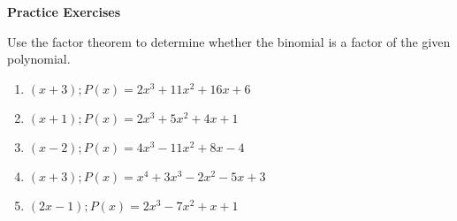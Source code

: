 \textbf{Practice Exercises}

\vspce

Use the factor theorem to determine whether the binomial is a factor of the given polynomial. 


\begin{enumerate}[label = \arabic*. ]

\item \hspce $(x+3); P(x) = 2x^3+11x^2+16x+6$
\vspce
\item \hspce $(x+1); P(x) = 2x^3+5x^2+4x+1$
\vspce
\item \hspce $(x-2); P(x) = 4x^3-11x^2+8x-4$
\vspce
\item \hspce $(x+3); P(x) = x^4+3x^3-2x^2-5x+3$
\vspce
\item \hspce $(2x-1); P(x) = 2x^3-7x^2+x+1$


\end{enumerate}



 




